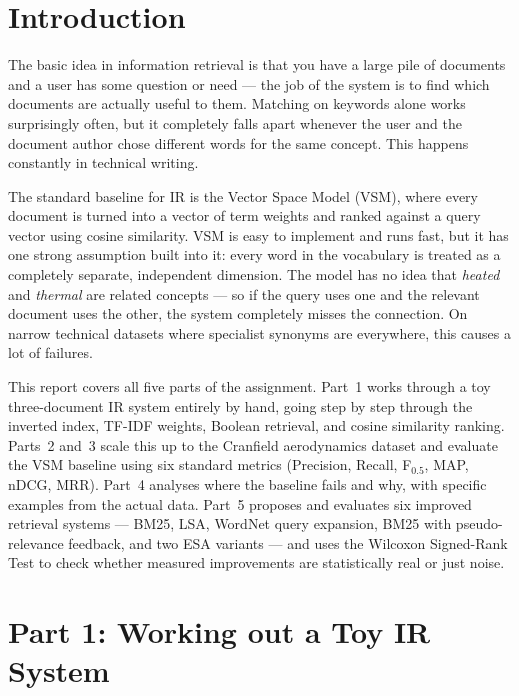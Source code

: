 \documentclass{svproc}
\begin{document}
    \section{Introduction}

    The basic idea in information retrieval is that you have a large pile of documents and a user has some question or need --- the job of the system is to find which documents are actually useful to them. Matching on keywords alone works surprisingly often, but it completely falls apart whenever the user and the document author chose different words for the same concept. This happens constantly in technical writing.

    The standard baseline for IR is the Vector Space Model (VSM), where every document is turned into a vector of term weights and ranked against a query vector using cosine similarity. VSM is easy to implement and runs fast, but it has one strong assumption built into it: every word in the vocabulary is treated as a completely separate, independent dimension. The model has no idea that \textit{heated} and \textit{thermal} are related concepts --- so if the query uses one and the relevant document uses the other, the system completely misses the connection. On narrow technical datasets where specialist synonyms are everywhere, this causes a lot of failures.

    This report covers all five parts of the assignment. Part~1 works through a toy three-document IR system entirely by hand, going step by step through the inverted index, TF-IDF weights, Boolean retrieval, and cosine similarity ranking. Parts~2 and~3 scale this up to the Cranfield aerodynamics dataset and evaluate the VSM baseline using six standard metrics (Precision, Recall, F$_{0.5}$, MAP, nDCG, MRR). Part~4 analyses where the baseline fails and why, with specific examples from the actual data. Part~5 proposes and evaluates six improved retrieval systems --- BM25, LSA, WordNet query expansion, BM25 with pseudo-relevance feedback, and two ESA variants --- and uses the Wilcoxon Signed-Rank Test to check whether measured improvements are statistically real or just noise.

    \FloatBarrier
    \section{Part 1: Working out a Toy IR System}
\end{document}

